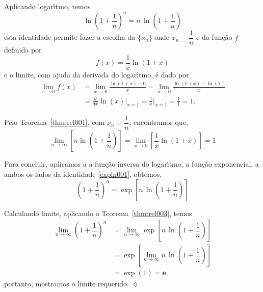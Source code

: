 \solo Aplicando logar\'{\i}tmo, temos
\begin{equation}\label{expln001}
    \ln \left(1+\dfrac{1}{n} \right)^n=n\, \ln \left(1+\dfrac{1}{n} \right)
\end{equation}
esta identidade permite fazer a escolha da \seq $\{x_n\}$ onde $x_n=\dfrac{1}{n}$ e da fun\c{c}\~{a}o $f$ definida por
\begin{equation*}
    f(x)=\frac{1}{x}\ln(1+x)
\end{equation*}
e o limite, com ajuda da derivada do logar\'{\i}tmo, \'{e} dado por
\begin{align*}
    \lim_{x\to 0} f(x)&=\lim_{x\to 0}\frac{\ln(1+x)-0}{x}=\lim_{x\to 0}\frac{\ln(1+x)-\ln(1)}{x}\\[2ex]
  &=\frac{d}{dx}\ln(x)\Big\vert_{x=1}=\frac{1}{x}\Big\vert_{x=1}=\frac{1}{1}=1.
\end{align*}

Pelo Teorema~\ref{thm:rel001}, com $x_n=\dfrac{1}{n}$, encontramos que,
\begin{equation*}
    \lim_{n\to\infty}\left[n\ln\left(1+\frac{1}{n} \right) \right]=\lim_{x\to 0}\left[\frac{1}{x}\ln(1+x)\right]=1
\end{equation*}

Para concluir, aplicamos a a fun\c{c}\~{a}o inversa do logar\'{\i}tmo, a fun\c{c}\~{a}o exponencial, a ambos os lados da identidade \eqref{expln001}, obtemos,
\begin{equation*}
 \left(1+\dfrac{1}{n} \right)^n= \exp\left[n\, \ln \left(1+\dfrac{1}{n} \right)\right]
\end{equation*}

Calculando limite, aplicando o Teorema~\ref{thm:rel003}, temos
\begin{align*}
 \lim_{n\to \infty}\left(1+\dfrac{1}{n} \right)^n&=\lim_{n\to \infty}\exp\left[n\,\ln \left(1+\dfrac{1}{n} \right)\right]\\[2ex]
&=\exp\left[\lim_{n\to \infty} n\,\ln \left(1+\dfrac{1}{n} \right)\right]\\[2ex]
&=\exp(1)=\mathbf{e}.
\end{align*}
portanto, mostramos o limite requerido. \hfill \(\lozenge\)

